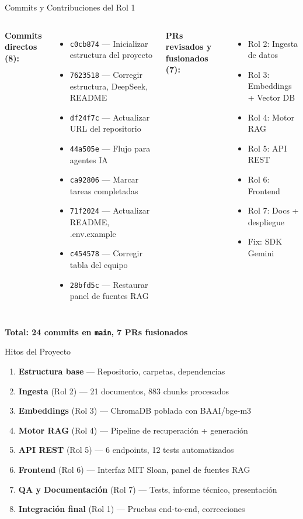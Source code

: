 \documentclass[aspectratio=169, 11pt]{beamer}
\begin{document}
\begin{frame}{Commits y Contribuciones del Rol 1}
\begin{columns}[T]
\textbf{Commits directos (8):}
\begin{itemize}
    \item \texttt{c0cb874} --- Inicializar estructura del proyecto
    \item \texttt{7623518} --- Corregir estructura, DeepSeek, README
    \item \texttt{df24f7c} --- Actualizar URL del repositorio
    \item \texttt{44a505e} --- Flujo para agentes IA
    \item \texttt{ca92806} --- Marcar tareas completadas
    \item \texttt{71f2024} --- Actualizar README, .env.example
    \item \texttt{c454578} --- Corregir tabla del equipo
    \item \texttt{28bfd5c} --- Restaurar panel de fuentes RAG
\end{itemize}

\textbf{PRs revisados y fusionados (7):}
\begin{itemize}
    \item Rol 2: Ingesta de datos
    \item Rol 3: Embeddings + Vector DB
    \item Rol 4: Motor RAG
    \item Rol 5: API REST
    \item Rol 6: Frontend
    \item Rol 7: Docs + despliegue
    \item Fix: SDK Gemini
\end{itemize}
\end{columns}
\vspace{0.3cm}
\centering
\textbf{Total: 24 commits en \texttt{main}, 7 PRs fusionados}
\end{frame}

\begin{frame}{Hitos del Proyecto}
\begin{enumerate}
    \item \textbf{Estructura base} --- Repositorio, carpetas, dependencias
    \item \textbf{Ingesta} (Rol 2) --- 21 documentos, 883 chunks procesados
    \item \textbf{Embeddings} (Rol 3) --- ChromaDB poblada con BAAI/bge-m3
    \item \textbf{Motor RAG} (Rol 4) --- Pipeline de recuperación + generación
    \item \textbf{API REST} (Rol 5) --- 6 endpoints, 12 tests automatizados
    \item \textbf{Frontend} (Rol 6) --- Interfaz MIT Sloan, panel de fuentes RAG
    \item \textbf{QA y Documentación} (Rol 7) --- Tests, informe técnico, presentación
    \item \textbf{Integración final} (Rol 1) --- Pruebas end-to-end, correcciones
\end{enumerate}
\end{frame}
\end{document}
